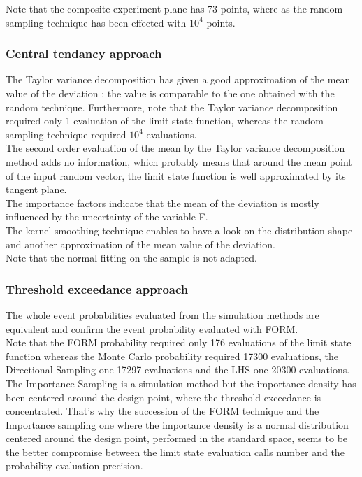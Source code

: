 \documentclass[11pt]{article}
\begin{document}
Note that the composite experiment plane has 73 points, where as the random sampling technique has been effected with $10^4$ points.



\subsubsection{Central tendancy approach}

The Taylor variance decomposition has given a good approximation of  the mean value of the deviation : the value is comparable to the one obtained with the random technique. Furthermore, note that the Taylor variance decomposition required only 1 evaluation of the limit state function, whereas the random sampling technique required $10^4$ evaluations.\\

The second order evaluation of the mean by the  Taylor variance decomposition method adds no information, which probably means that around the mean point of the input random vector, the limit state function is well approximated by its tangent plane.\\

The importance factors indicate that the mean of the deviation is mostly influenced by the uncertainty of the variable F.\\

The kernel smoothing technique enables to have a look on the distribution shape and  another approximation of the mean value of the deviation.\\
Note that the normal fitting on the sample is not adapted.



\subsubsection{Threshold exceedance approach}

The whole event probabilities evaluated from the simulation methods are equivalent and confirm the event probability evaluated with FORM.\\

Note that the FORM probability required only 176 evaluations of the limit state function whereas the Monte Carlo probability required 17300 evaluations, the Directional Sampling one 17297 evaluations and the LHS one 20300 evaluations.\\
The Importance Sampling is a simulation method but the importance density has been centered around the design point, where the threshold exceedance is concentrated. That's why the succession of the FORM technique and the Importance sampling one where the importance density is a normal distribution centered around the design point, performed in the standard space, seems to be the better compromise between the limit state evaluation calls number and the probability evaluation precision.\\
\end{document}
